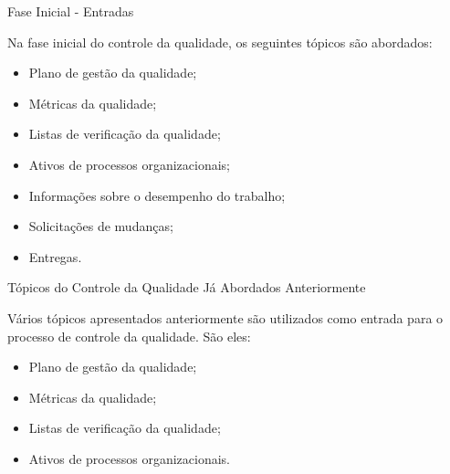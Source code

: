 \documentclass[xcolor=x11names,compress]{beamer}
\begin{document}
\begin{frame}[allowframebreaks=.7]{Fase Inicial - Entradas}

Na fase inicial do controle da qualidade, os seguintes tópicos são abordados:

\begin{itemize}
\itemsep 5mm

\item Plano de gestão da qualidade;

\item Métricas da qualidade;

\item Listas de verificação da qualidade;

\item Ativos de processos organizacionais;

\item Informações sobre o desempenho do trabalho;

\item Solicitações de mudanças;

\item Entregas.

\end{itemize}

\end{frame}

\begin{frame}{Tópicos do Controle da Qualidade Já Abordados Anteriormente}

Vários tópicos apresentados anteriormente são utilizados como entrada para o processo de controle da qualidade. São eles:

\begin{itemize}
\itemsep 5mm

\item Plano de gestão da qualidade;

\item Métricas da qualidade;

\item Listas de verificação da qualidade;

\item Ativos de processos organizacionais.

\end{itemize}

\end{frame}
\end{document}
